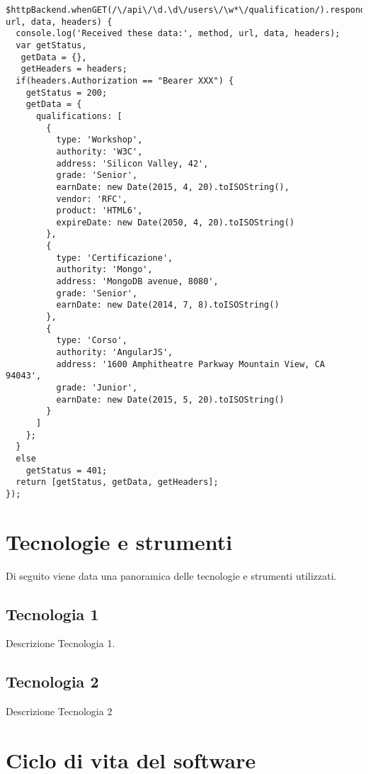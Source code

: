 \begin{verbatim}
$httpBackend.whenGET(/\/api\/\d.\d\/users\/\w*\/qualification/).respond(function(method, url, data, headers) {
  console.log('Received these data:', method, url, data, headers);
  var getStatus,
   getData = {},
   getHeaders = headers;
  if(headers.Authorization == "Bearer XXX") {
    getStatus = 200;
    getData = {
      qualifications: [
        {
          type: 'Workshop',
          authority: 'W3C',
          address: 'Silicon Valley, 42',
          grade: 'Senior',
          earnDate: new Date(2015, 4, 20).toISOString(),
          vendor: 'RFC',
          product: 'HTML6',
          expireDate: new Date(2050, 4, 20).toISOString()
        },
        {
          type: 'Certificazione',
          authority: 'Mongo',
          address: 'MongoDB avenue, 8080',
          grade: 'Senior',
          earnDate: new Date(2014, 7, 8).toISOString()
        },
        {
          type: 'Corso',
          authority: 'AngularJS',
          address: '1600 Amphitheatre Parkway Mountain View, CA 94043',
          grade: 'Junior',
          earnDate: new Date(2015, 5, 20).toISOString()
        }
      ]
    };
  }
  else
    getStatus = 401;
  return [getStatus, getData, getHeaders];
});
\end{verbatim} 


\section{Tecnologie e strumenti}
\label{sec:tecnologie-strumenti}

Di seguito viene data una panoramica delle tecnologie e strumenti utilizzati.

\subsection*{Tecnologia 1}
Descrizione Tecnologia 1.

\subsection*{Tecnologia 2}
Descrizione Tecnologia 2

\section{Ciclo di vita del software}
\label{sec:ciclo-vita-software}

